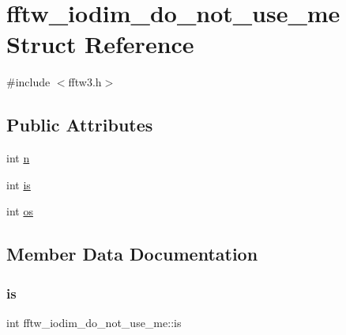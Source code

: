 \hypertarget{structfftw__iodim__do__not__use__me}{}\section{fftw\+\_\+iodim\+\_\+do\+\_\+not\+\_\+use\+\_\+me Struct Reference}
\label{structfftw__iodim__do__not__use__me}


{\ttfamily \#include $<$fftw3.\+h$>$}

\subsection*{Public Attributes}
\begin{DoxyCompactItemize}
\item 
int \hyperlink{structfftw__iodim__do__not__use__me_aa9ceb61afc1731380bdb48305aa40ce0}{n}
\item 
int \hyperlink{structfftw__iodim__do__not__use__me_a7571fd050be3b9c9486d41086b657099}{is}
\item 
int \hyperlink{structfftw__iodim__do__not__use__me_acff6a6b2225f610d3bee5380e801abb4}{os}
\end{DoxyCompactItemize}


\subsection{Member Data Documentation}
\mbox{\label{structfftw__iodim__do__not__use__me_a7571fd050be3b9c9486d41086b657099}} 
\subsubsection{\texorpdfstring{is}{is}}
{\footnotesize\ttfamily int fftw\+\_\+iodim\+\_\+do\+\_\+not\+\_\+use\+\_\+me\+::is}

\mbox{\label{structfftw__iodim__do__not__use__me_aa9ceb61afc1731380bdb48305aa40ce0}} 
